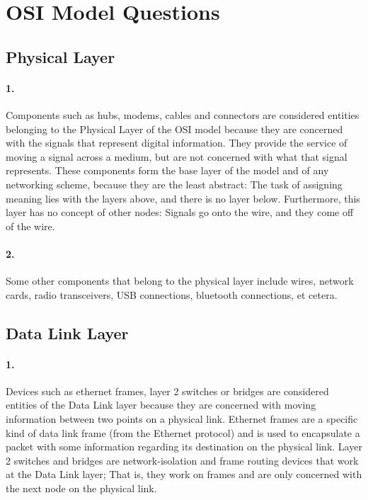 \documentclass[11pt]{article}
\begin{document}

\pagebreak

\section{OSI Model Questions}
\subsection{Physical Layer}
\paragraph{1.}
Components such as hubs, modems, cables and connectors are considered entities belonging to the Physical Layer of the OSI model because they are concerned with the signals that represent digital information. They provide the service of moving a signal across a medium, but are not concerned with what that signal represents. These components form the base layer of the model and of any networking scheme, because they are the least abstract: The task of assigning meaning lies with the layers above, and there is no layer below. Furthermore, this layer has no concept of other nodes: Signals go onto the wire, and they come off of the wire.
\paragraph{2.}
Some other components that belong to the physical layer include wires, network cards, radio transceivers, USB connections, bluetooth connections, et cetera.

\subsection{Data Link Layer}
\paragraph{1.}
Devices such as ethernet frames, layer 2 switches or bridges are considered entities of the Data Link layer because they are concerned with moving information between two points on a physical link. Ethernet frames are a specific kind of data link frame (from the Ethernet protocol) and is used to encapsulate a packet with some information regarding its destination on the physical link. Layer 2 switches and bridges are network-isolation and frame routing devices that work at the Data Link layer; That is, they work on frames and are only concerned with the next node on the physical link.
\end{document}
